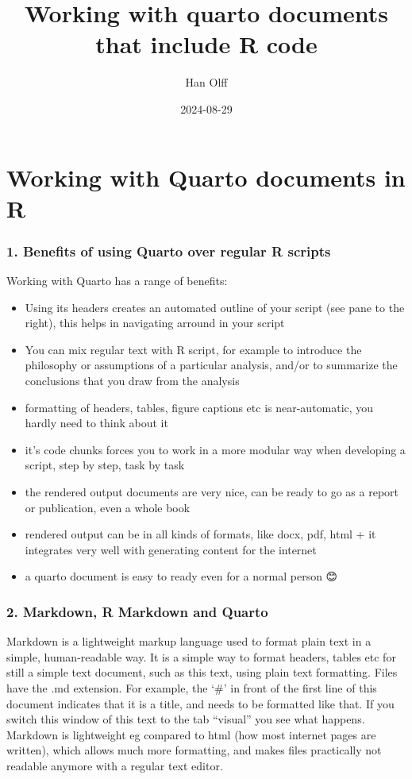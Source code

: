 \documentclass[
  letterpaper,
  DIV=11,
  numbers=noendperiod]{scrartcl}
\title{Working with quarto documents that include R code}
\author{Han Olff}
\date{2024-08-29}
\providecommand{\tightlist}{%
  \setlength{\itemsep}{0pt}\setlength{\parskip}{0pt}}\usepackage{longtable,booktabs,array}
\begin{document}
\maketitle

\section{Working with Quarto documents in
R}\label{working-with-quarto-documents-in-r}

\subsubsection{1. Benefits of using Quarto over regular R
scripts}\label{benefits-of-using-quarto-over-regular-r-scripts}

Working with Quarto has a range of benefits:

\begin{itemize}
\tightlist
\item
  Using its headers creates an automated outline of your script (see
  pane to the right), this helps in navigating arround in your script
\item
  You can mix regular text with R script, for example to introduce the
  philosophy or assumptions of a particular analysis, and/or to
  summarize the conclusions that you draw from the analysis
\item
  formatting of headers, tables, figure captions etc is near-automatic,
  you hardly need to think about it
\item
  it's code chunks forces you to work in a more modular way when
  developing a script, step by step, task by task
\item
  the rendered output documents are very nice, can be ready to go as a
  report or publication, even a whole book
\item
  rendered output can be in all kinds of formats, like docx, pdf, html +
  it integrates very well with generating content for the internet
\item
  a quarto document is easy to ready even for a normal person 😊
\end{itemize}

\subsubsection{2. Markdown, R Markdown and
Quarto}\label{markdown-r-markdown-and-quarto}

Markdown is a lightweight markup language used to format plain text in a
simple, human-readable way. It is a simple way to format headers, tables
etc for still a simple text document, such as this text, using plain
text formatting. Files have the .md extension. For example, the `\#' in
front of the first line of this document indicates that it is a title,
and needs to be formatted like that. If you switch this window of this
text to the tab ``visual'' you see what happens. Markdown is lightweight
eg compared to html (how most internet pages are written), which allows
much more formatting, and makes files practically not readable anymore
with a regular text editor.
\end{document}
